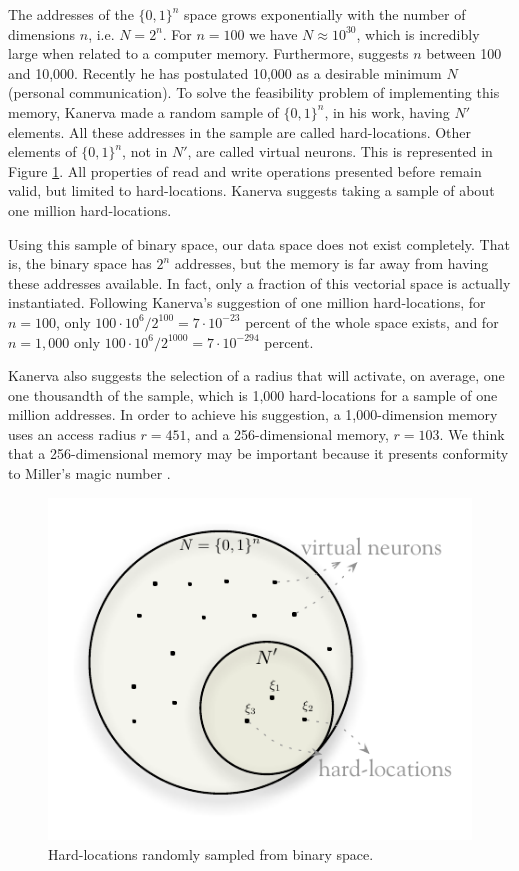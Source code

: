 The addresses of the $\{0,1\}^{n}$ space grows exponentially with the number of dimensions $n$, i.e. $N=2^{n}$. For $n=100$ we have $N\approx10^{30}$, which is incredibly large when related to a computer memory. Furthermore, \citet{Kanerva1988} suggests $n$ between 100 and 10,000. Recently he has postulated 10,000 as a desirable minimum $N$ (personal communication). To solve the feasibility problem of implementing this memory, Kanerva made a random sample of $\{0,1\}^{n}$, in his work, having $N'$ elements. All these addresses in the sample are called hard-locations. Other elements of $\{0,1\}^{n}$, not in $N'$, are called virtual neurons. This is represented in Figure \ref{fig-hardlocations}.  All properties of read and write operations presented before remain valid, but limited to hard-locations. Kanerva suggests taking a sample of about one million hard-locations.

Using this sample of binary space, our data space does not exist completely.  That is, the binary space has $2^{n}$ addresses, but the memory is far away from having these addresses available. In fact, only a fraction of this vectorial space is actually instantiated. Following Kanerva's suggestion of one million hard-locations, for $n=100$, only $100\cdot10^{6}/2^{100}=7\cdot10^{-23}$ percent of the whole space exists, and for $n=1,000$ only $100\cdot10^{6}/2^{1000}=7\cdot10^{-294}$ percent.

Kanerva also suggests the selection of a radius that will activate, on average, one one thousandth of the sample, which is 1,000 hard-locations for a sample of one million addresses. In order to achieve his suggestion, a 1,000-dimension memory uses an access radius $r=451$, and a 256-dimensional memory, $r=103$. We think that a 256-dimensional memory may be important because it presents conformity to Miller's magic number \citep{Linhares2011}.

\begin{figure}[!htb]
\centering\includegraphics[scale=0.75]{./images02/hardlocations.pdf}

\caption{Hard-locations randomly sampled from binary space.\label{fig-hardlocations}}
\end{figure}


